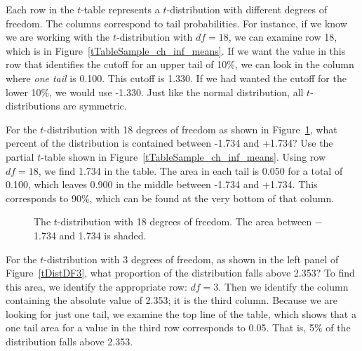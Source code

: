 Each row in the $t$-table represents a $t$-distribution with different degrees of freedom. The columns correspond to tail probabilities. For instance, if we know we are working with the $t$-distribution with $df=18$, we can examine row 18, which is  in Figure~\ref{tTableSample_ch_inf_means}. If we want the value in this row that identifies the cutoff for an upper tail of 10\%, we can look in the column where \emph{one tail} is 0.100. This cutoff is 1.330. If we had wanted the cutoff for the lower 10\%, we would use -1.330. Just like the normal distribution, all $t$-distributions are symmetric.


%

\begin{examplewrap}
\begin{nexample}{For the $t$-distribution with 18 degrees of freedom as shown in Figure~\ref{tDistDF18}, what percent of the distribution is contained between -1.734 and +1.734?  Use the partial $t$-table shown in Figure~\ref{tTableSample_ch_inf_means}.}
Using row $df = 18$, we find 1.734 in the table. The area in each tail is 0.050 for a total of 0.100, which leaves 0.900 in the middle between -1.734 and +1.734. This corresponds to 90\%, which can be found at the very bottom of that  column.  
\end{nexample}
\end{examplewrap}

\begin{figure}
\centering
\caption{The $t$-distribution with 18 degrees of freedom. The area between $-$1.734 and 1.734 is shaded.}
\label{tDistDF18}
\end{figure}

\newpage
\begin{examplewrap}
\begin{nexample}{For the $t$-distribution with 3 degrees of freedom, as shown in the left panel of Figure~\ref{tDistDF3}, what proportion of the distribution falls above 2.353?}
To find this area, we identify the appropriate row: $df=3$. Then we identify the column containing the absolute value of 2.353; it is the third column. Because we are looking for just one tail, we examine the top line of the table, which shows that a one tail area for a value in the third row corresponds to 0.05. That is, 5\% of the distribution falls above 2.353.
\end{nexample}
\end{examplewrap}

